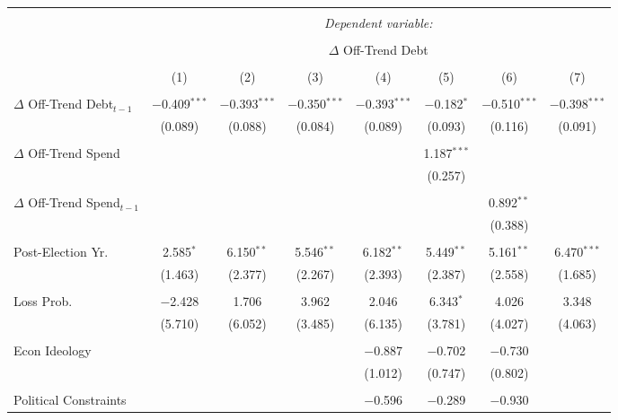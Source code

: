 
\begingroup 
\tiny 
\begin{tabular}{@{\extracolsep{5pt}}lccccccc} 
\\[-1.8ex]\hline 
\hline \\[-1.8ex] 
 & \multicolumn{7}{c}{\textit{Dependent variable:}} \\ 
\cline{2-8} 
\\[-1.8ex] & \multicolumn{7}{c}{$\Delta$ Off-Trend Debt} \\ 
\\[-1.8ex] & (1) & (2) & (3) & (4) & (5) & (6) & (7)\\ 
\hline \\[-1.8ex] 
 $\Delta$ Off-Trend Debt$_{t-1}$ & $-$0.409$^{***}$ & $-$0.393$^{***}$ & $-$0.350$^{***}$ & $-$0.393$^{***}$ & $-$0.182$^{*}$ & $-$0.510$^{***}$ & $-$0.398$^{***}$ \\ 
  & (0.089) & (0.088) & (0.084) & (0.089) & (0.093) & (0.116) & (0.091) \\ 
  & & & & & & & \\ 
 $\Delta$ Off-Trend Spend &  &  &  &  & 1.187$^{***}$ &  &  \\ 
  &  &  &  &  & (0.257) &  &  \\ 
  & & & & & & & \\ 
 $\Delta$ Off-Trend Spend$_{t-1}$ &  &  &  &  &  & 0.892$^{**}$ &  \\ 
  &  &  &  &  &  & (0.388) &  \\ 
  & & & & & & & \\ 
 Post-Election Yr. & 2.585$^{*}$ & 6.150$^{**}$ & 5.546$^{**}$ & 6.182$^{**}$ & 5.449$^{**}$ & 5.161$^{**}$ & 6.470$^{***}$ \\ 
  & (1.463) & (2.377) & (2.267) & (2.393) & (2.387) & (2.558) & (1.685) \\ 
  & & & & & & & \\ 
 Loss Prob. & $-$2.428 & 1.706 & 3.962 & 2.046 & 6.343$^{*}$ & 4.026 & 3.348 \\ 
  & (5.710) & (6.052) & (3.485) & (6.135) & (3.781) & (4.027) & (4.063) \\ 
  & & & & & & & \\ 
 Econ Ideology &  &  &  & $-$0.887 & $-$0.702 & $-$0.730 &  \\ 
  &  &  &  & (1.012) & (0.747) & (0.802) &  \\ 
  & & & & & & & \\ 
 Political Constraints &  &  &  & $-$0.596 & $-$0.289 & $-$0.930 &  \\ 

\end{tabular}
